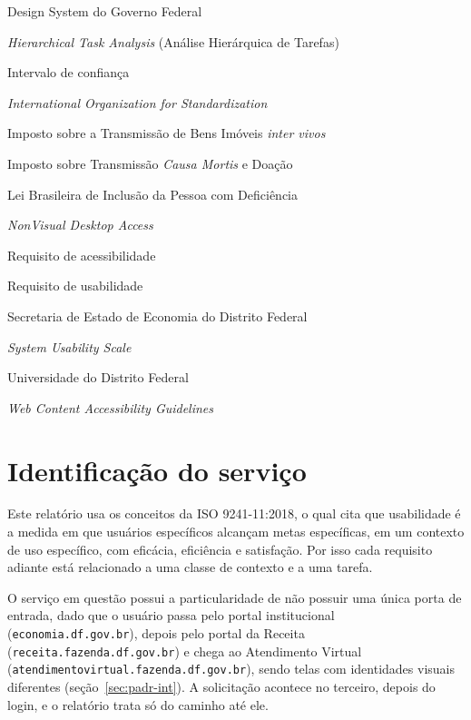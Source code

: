 \documentclass[
  12pt,
  oneside,
  a4paper,
  chapter=TITLE,
  section=TITLE,
  english,
  brazilian
]{abntex2}
\begin{document}
\begin{siglas}
  \item[DSGov]  Design System do Governo Federal
  \item[HTA]    \textit{Hierarchical Task Analysis} (Análise Hierárquica de Tarefas)
  \item[IC]     Intervalo de confiança
  \item[ISO]    \textit{International Organization for Standardization}
  \item[ITBI]   Imposto sobre a Transmissão de Bens Imóveis \textit{inter vivos}
  \item[ITCD]   Imposto sobre Transmissão \textit{Causa Mortis} e Doação
  \item[LBI]    Lei Brasileira de Inclusão da Pessoa com Deficiência
  \item[NVDA]   \textit{NonVisual Desktop Access}
  \item[RA]     Requisito de acessibilidade
  \item[RU]     Requisito de usabilidade
  \item[SEEC]   Secretaria de Estado de Economia do Distrito Federal
  \item[SUS]    \textit{System Usability Scale}
  \item[UnDF]   Universidade do Distrito Federal
  \item[WCAG]   \textit{Web Content Accessibility Guidelines}
\end{siglas}

\tableofcontents*
\cleardoublepage

\textual

\chapter{Identificação do serviço}\label{cap:identificacao}

Este relatório usa os conceitos da ISO 9241-11:2018, o qual cita que usabilidade é a medida em
que usuários específicos alcançam metas específicas, em um contexto de uso
específico, com eficácia, eficiência e satisfação. Por isso cada requisito
adiante está relacionado a uma classe de contexto e a uma tarefa.

O serviço em questão possui a particularidade de não possuir uma única porta de
entrada, dado que o usuário passa pelo portal institucional
(\texttt{economia.df.gov.br}), depois pelo portal da Receita
(\texttt{receita.fazenda.df.gov.br}) e chega ao Atendimento Virtual
(\texttt{atendimentovirtual.fazenda.df.gov.br}), sendo telas com identidades
visuais diferentes (seção~\ref{sec:padr-int}). A solicitação acontece no
terceiro, depois do login, e o relatório trata só do caminho até ele.
\end{document}
